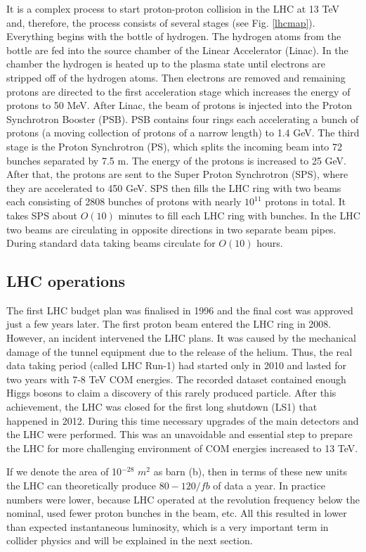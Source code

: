 It is a complex process to start proton-proton collision in the LHC at 13 TeV and, therefore, the process consists of several stages (see Fig. \ref{lhcmap}). Everything begins with the bottle of hydrogen. The hydrogen atoms from the bottle are fed into the source chamber of the Linear Accelerator (Linac). In the chamber the hydrogen is heated up to the plasma state until electrons are stripped off of the hydrogen atoms. Then electrons are removed and remaining protons are directed to the first acceleration stage which increases the energy of protons to 50 MeV. After Linac, the beam of protons is injected into the Proton Synchrotron Booster (PSB). PSB contains four rings each accelerating a bunch of protons (a moving collection of protons of a narrow length) to 1.4 GeV. The third stage is the Proton Synchrotron (PS), which splits the incoming beam into 72 bunches separated by 7.5 m. The energy of the protons is increased to 25 GeV. After that, the protons are sent to the Super Proton Synchrotron (SPS), where they are accelerated to 450 GeV. SPS then fills the LHC ring with two beams each consisting of 2808 bunches of protons with nearly $10^{11}$ protons in total. It takes SPS about $O(10)$ minutes to fill each LHC ring with bunches. In the LHC two beams are circulating in opposite directions in two separate beam pipes. During standard data taking beams circulate for $O(10)$ hours.  


\subsection{LHC operations}

The first LHC budget plan was finalised in 1996 and the final cost was approved just a few years later. The first proton beam entered the LHC ring in 2008. However, an incident intervened the LHC plans. It was caused by the mechanical damage of the tunnel equipment due to the release of the helium. Thus, the real data taking period (called LHC Run-1) had started only in 2010 and lasted for two years with 7-8 TeV COM energies. The recorded dataset contained enough Higgs bosons to claim a discovery of this rarely produced particle. After this achievement, the LHC was closed for the first long shutdown (LS1) that happened in 2012. During this time necessary upgrades of the main detectors and the LHC were performed. This was an unavoidable and essential step to prepare the LHC for more challenging environment of COM energies increased to 13 TeV. 


If we denote the area of 10$^{-28}$ $m^2$ as barn (b), then in terms of these new units the LHC can theoretically produce $80-120/fb$ of data a year. In practice numbers were lower, because LHC operated at the revolution frequency below the nominal, used fewer proton bunches in the beam, etc.  All this resulted in lower than expected instantaneous luminosity, which is a very important term in collider physics and will be explained in the next section.


